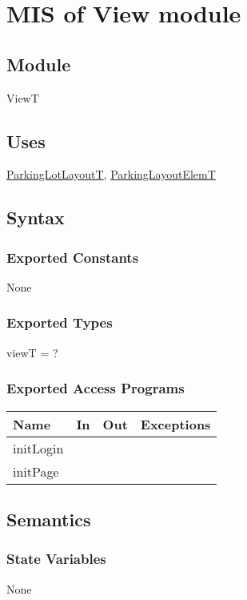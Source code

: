 \documentclass[12pt, titlepage]{article}
\begin{document}
\newpage

\section{MIS of View module}
\label{view:Module}

\subsection{Module}
ViewT

\subsection{Uses}
\hyperref[parkingLotLayout:Module]{ParkingLotLayoutT}, 
\hyperref[parkingLayoutElem:Module]{ParkingLayoutElemT} 

\subsection{Syntax}

\subsubsection{Exported Constants}
None

\subsubsection{Exported Types}
viewT = ?

\subsubsection{Exported Access Programs}

\begin{tabular}{l l l l}
\hline
\textbf{Name} & \textbf{In} & \textbf{Out} & \textbf{Exceptions} \\
\hline
initLogin & ~ & ~ & ~ \\
initPage & ~ & ~ & ~ \\

\hline
\end{tabular}

\subsection{Semantics}

\subsubsection{State Variables}
None
\end{document}
